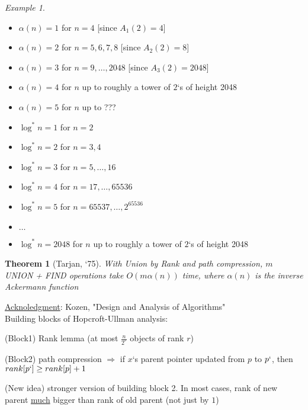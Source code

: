 \documentclass[a4paper,12pt]{article}
\theoremstyle{plain}
\newtheorem*{theorem}{Theorem}
\theoremstyle{definition}
\theoremstyle{remark}
\newtheorem*{example}{Example}
\begin{document}
\begin{example}
\begin{itemize}
	\item $\alpha(n) = 1$ for $n = 4$ [since $A_1(2)=4$]
	\item $\alpha(n) = 2$ for $n = 5, 6, 7, 8$ [since $A_2(2)=8$]
	\item $\alpha(n) = 3$ for $n = 9, \dots, 2048$ [since $A_3(2)=2048$]
	\item $\alpha(n) = 4$ for $n$ up to roughly a tower of $2$`s of height 2048
	\item $\alpha(n) = 5$ for $n$ up to ???
\end{itemize}

\begin{itemize}
	\item $\log^* n = 1$ for $n = 2$
	\item $\log^* n = 2$ for $n = 3, 4$
	\item $\log^* n = 3$ for $n = 5, \dots, 16$
	\item $\log^* n = 4$ for $n = 17, \dots, 65536$
	\item $\log^* n = 5$ for $n = 65537, \dots, 2^{65536}$
	\item $\dots$
	\item $\log^* n = 2048$ for $n$ up to roughly a tower of $2$`s of height 2048
\end{itemize}
\end{example}

\begin{theorem}[Tarjan, `75] With Union by Rank and path compression, $m$ UNION + FIND operations take $O(m \alpha(n))$ time, where $\alpha(n)$ is the inverse Ackermann function\end{theorem}

\underline{Acknoledgment}: Kozen, "Design and Analysis of Algorithms"
\\

Building blocks of Hopcroft-Ullman analysis:
\begin{description}
	\item{(Block1)} Rank lemma (at most $\frac{n}{2^r}$ objects of rank $r$)
	\item{(Block2)} path compression $\Rightarrow$ if $x$`s parent pointer updated from $p$ to $p`$, then $rank[p`] \geq rank[p] + 1$
	\item{(New idea)} stronger version of building block 2. In most cases, rank of new parent \underline{much} bigger than rank of old parent (not just by $1$)
\end{description}
\end{document}
